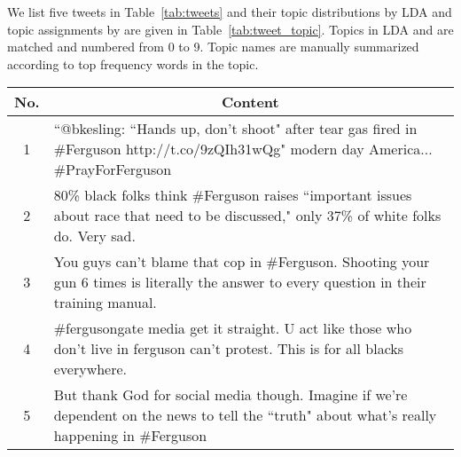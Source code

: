 We list five tweets in Table~\ref{tab:tweets} and their topic distributions by LDA and topic assignments by \stlda are given in Table~\ref{tab:tweet_topic}. Topics in LDA and \stlda are matched and numbered from 0 to 9. Topic names are manually summarized according to top frequency words in the topic.

\begin{table*}[htpb]
\centering
\begin{tabular}{|c|p{14cm}|}
\hline
\bf No. & \multicolumn{1}{c|}{\bf Content}\\ \hline
1 & ``@bkesling: ``Hands up, don't shoot" after tear gas fired in \#Ferguson http://t.co/9zQIh31wQg" modern day America...  \#PrayForFerguson\\ \hline
2 & 80\% black folks think \#Ferguson raises ``important issues about race that need to be discussed," only 37\% of white folks do. Very sad.\\ \hline
3 & You guys can't blame that cop in \#Ferguson. Shooting your gun 6 times is literally the answer to every question in their training manual.\\ \hline
4 & \#fergusongate media get it straight. U act like those who don't live in ferguson can't protest. This is for all blacks everywhere.\\ \hline
5 & But thank God for social media though. Imagine if we're dependent on the news to tell the ``truth" about what's really happening in \#Ferguson\\ \hline
\end{tabular}
\caption{Tweet Examples}\label{tab:tweets}
\end{table*}

